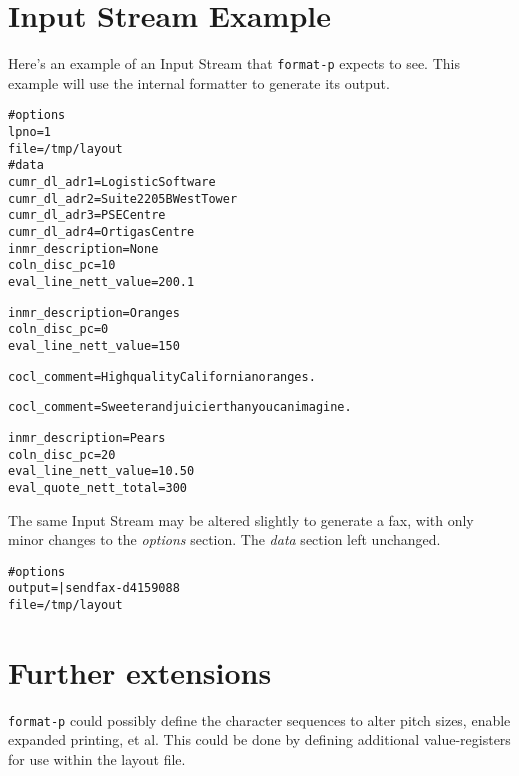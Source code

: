 \documentclass[a4paper,twoside]{article}
\begin{document}
\section{Input Stream Example}

Here's an example of an Input Stream that \texttt{format-p}
expects to see. This example will use the internal formatter
to generate its output.

\begin{alltt}
#options
lpno=1
file=/tmp/layout
#data
cumr_dl_adr1=Logistic Software
cumr_dl_adr2=Suite 2205B West Tower
cumr_dl_adr3=PSE Centre
cumr_dl_adr4=Ortigas Centre
inmr_description=None
coln_disc_pc=10
eval_line_nett_value=200.1

inmr_description=Oranges
coln_disc_pc=0
eval_line_nett_value=150

%body=cocl-body
cocl_comment=High quality Californian oranges.

cocl_comment=Sweeter and juicier than you can imagine.

%body=
inmr_description=Pears
coln_disc_pc=20
eval_line_nett_value=10.50
eval_quote_nett_total=300
\end{alltt}

The same Input Stream may be altered slightly to generate a fax, with
only minor changes to the \emph{options} section. The \emph{data} section
left unchanged.

\begin{alltt}
#options
output=|sendfax -d 4159088
file=/tmp/layout
\end{alltt}

\section{Further extensions}

\texttt{format-p} could possibly define
the character sequences to alter pitch sizes, enable
expanded printing, et al. This could be done by defining
additional value-registers for use within the layout file.
\end{document}
